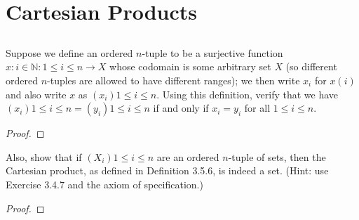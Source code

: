 \documentclass[../../main.tex]{subfiles}
\begin{document}
\section{Cartesian Products}

\addtocounter{subsection}{1}
\subsection{}
\begin{q}
    Suppose we define an ordered $n$-tuple to be a surjective function $x : {i \in \mathbb{N} : 1 \leq i \leq n} \to X$ whose codomain is some arbitrary set $X$ (so different ordered $n$-tuples are allowed to have different ranges); we then write $x_i$ for $x(i)$ and also write $x$ as $(x_i){1 \leq i \leq n}$. Using this definition, verify that we have $(x_i){1 \leq i \leq n} = (y_i){1 \leq i \leq n}$ if and only if $x_i = y_i$ for all $1 \leq i \leq n$. 
\end{q}

\begin{proof}

\end{proof}
\begin{xx}
    
\end{xx}

\begin{q}
    Also, show that if $(X_i){1 \leq i \leq n}$ are an ordered $n$-tuple of sets, then the Cartesian product, as defined in Definition 3.5.6, is indeed a set. (Hint: use Exercise 3.4.7 and the axiom of specification.)
\end{q}

\begin{proof}

\end{proof}
\begin{xx}
    
\end{xx}

\addtocounter{subsection}{1}
\end{document}
